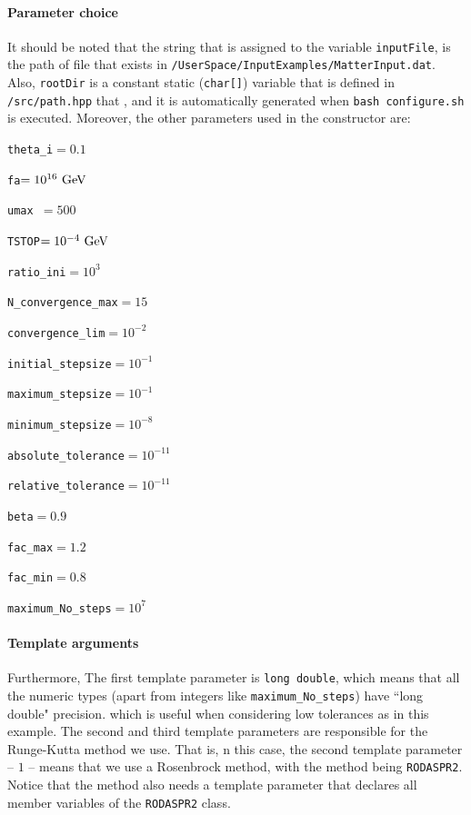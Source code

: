 \documentclass[11pt,a4paper]{article}
\begin{document}
\paragraph{Parameter choice}
%
It should be noted that the string that is assigned to the variable {\tt inputFile}, is the path of file that exists in {\tt \mimes/UserSpace/InputExamples/MatterInput.dat}. Also, {\tt rootDir} is a constant static ({\tt char[]}) variable that  is defined in {\tt \mimes/src/path.hpp} that , and it is automatically generated when {\tt bash configure.sh} is executed.  Moreover, the other parameters used in the constructor are:
%
\begin{itemize}
	\begin{minipage}{0.3\linewidth}
	\item {\tt theta\_i}$=0.1$
	\item {\tt fa}$=10^{16}~{\rm GeV}$
	\item {\tt umax }$=500$
	\item {\tt TSTOP}$=10^{-4}~{\rm GeV}$
	\item {\tt ratio\_ini}$=10^3$
	\item  {\tt N\_convergence\_max}$=15$
	\end{minipage}
	\begin{minipage}{0.35\linewidth}
	\item  {\tt convergence\_lim}$=10^{-2}$
	\item {\tt initial\_stepsize}$=10^{-1}$ 
	\item {\tt maximum\_stepsize}$=10^{-1}$ 
	\item {\tt minimum\_stepsize}$=10^{-8}$
	\item {\tt absolute\_tolerance}$=10^{-11}$
	\item {\tt relative\_tolerance}$=10^{-11}$
	\end{minipage}
	\begin{minipage}{0.3\linewidth}
	\item {\tt beta}$=0.9$
	\item {\tt fac\_max}$=1.2$
	\item {\tt fac\_min}$=0.8$
	\item {\tt maximum\_No\_steps}$=10^7$
	\item[]{\vfill}	\item[]{\vfill}	\item[]{\vfill}
	\end{minipage}
\end{itemize}

\paragraph{Template arguments}
%
Furthermore, The first template parameter is {\tt long double}, which means that all the numeric types (apart from integers like {\tt maximum\_No\_steps}) have ``long double" precision. which is useful when considering low tolerances as in this example. The second and third template parameters are responsible for the Runge-Kutta method we use. That is, n this case, the second template parameter -- $1$ -- means that we use a Rosenbrock method, with the method being {\tt RODASPR2}. Notice that the method also needs a template parameter that declares all member variables of the {\tt RODASPR2} class.
\end{document}
